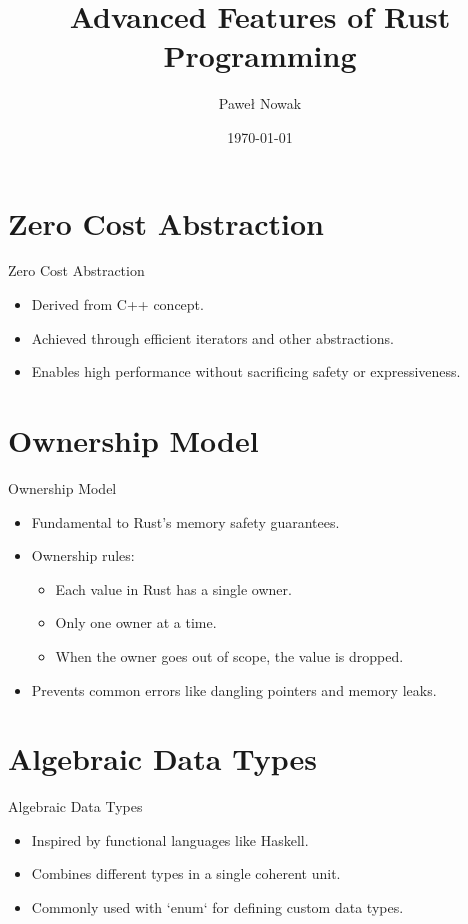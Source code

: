 \documentclass{beamer}
\title{Advanced Features of Rust Programming}
\author{Paweł Nowak}
\date{\today}
\begin{document}
\maketitle

\section{Zero Cost Abstraction}
\begin{frame}{Zero Cost Abstraction}
\begin{itemize}
  \item Derived from C++ concept.
  \item Achieved through efficient iterators and other abstractions.
  \item Enables high performance without sacrificing safety or expressiveness.
\end{itemize}
\end{frame}

\section{Ownership Model}
\begin{frame}{Ownership Model}
\begin{itemize}
  \item Fundamental to Rust’s memory safety guarantees.
  \item Ownership rules:
    \begin{itemize}
      \item Each value in Rust has a single owner.
      \item Only one owner at a time.
      \item When the owner goes out of scope, the value is dropped.
    \end{itemize}
  \item Prevents common errors like dangling pointers and memory leaks.
\end{itemize}
\end{frame}

\section{Algebraic Data Types}
\begin{frame}{Algebraic Data Types}
\begin{itemize}
  \item Inspired by functional languages like Haskell.
  \item Combines different types in a single coherent unit.
  \item Commonly used with `enum` for defining custom data types.
\end{itemize}
\end{frame}
\end{document}
